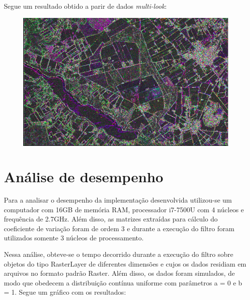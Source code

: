 \documentclass[12pt]{article}
\begin{document}
Segue um resultado obtido a parir de dados \textit{multi-look}:

\begin{figure}[!h]
	\begin{center}    
		\includegraphics[width = 130mm, scale = 0.5]{../../Images/Report_29_08_18/foulum_cv_reduced.png} \\ 
 	\end{center}
\end{figure}

\newpage

\section{Análise de desempenho}

Para a analisar o desempenho da implementação desenvolvida utilizou-se um computador com 16GB de memória RAM, processador i7-7500U com 4 núcleos e frequência de 2.7GHz. Além disso, as matrizes extraídas para cálculo do coeficiente de variação foram de ordem 3 e durante a execução do filtro foram utilizados somente 3 núcleos de processamento.

Nessa análise, obteve-se o tempo decorrido durante a execução do filtro sobre objetos do tipo RasterLayer de diferentes dimensões e cujos os dados residiam em arquivos no formato padrão Raster. Além disso, os dados foram simulados, de modo que obedecem a distribuição contínua uniforme com parâmetros a = 0 e b = 1. Segue um gráfico com os resultados:
\end{document}
